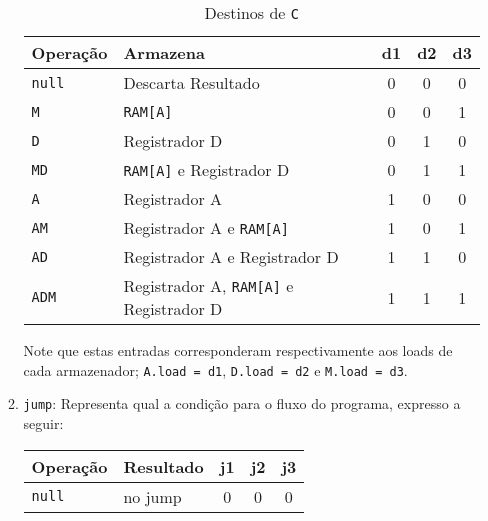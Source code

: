 \documentclass{article}
\begin{document}
\begin{enumerate}[noitemsep]
\begin{enumerate}
\begin{table}[H]
                                    \centering
                                    \begin{tabular}[]{l|l|ccc}\hline
                                        Operação      & Armazena                                       & d1& d2& d3\\\hline
                                        \texttt{null} & Descarta Resultado                             & 0 & 0 & 0\\
                                        \texttt{M}    & \texttt{RAM[A]}                                & 0 & 0 & 1\\
                                        \texttt{D}    & Registrador D                                  & 0 & 1 & 0\\
                                        \texttt{MD}   & \texttt{RAM[A]} e Registrador D                & 0 & 1 & 1\\
                                        \texttt{A}    & Registrador A                                  & 1 & 0 & 0\\
                                        \texttt{AM}   & Registrador A e \texttt{RAM[A]}                & 1 & 0 & 1\\
                                        \texttt{AD}   & Registrador A e Registrador D                  & 1 & 1 & 0\\
                                        \texttt{ADM}  & Registrador A, \texttt{RAM[A]} e Registrador D & 1 & 1 & 1\\\hline
                                    \end{tabular}
                                    \caption{Destinos de \texttt{C}}
                                \end{table}\noindent
                            Note que estas entradas corresponderam respectivamente aos loads de cada armazenador; \texttt{A.load = d1}, \texttt{D.load = d2} e \texttt{M.load = d3}.
                            \item \texttt{jump}: Representa qual a condição para o fluxo do programa, expresso a seguir:
                                \begin{table}[H]
                                    \centering
                                    \begin{tabular}[]{l|l|ccc}\hline
                                        Operação      & Resultado          & j1& j2& j3\\\hline
                                        \texttt{null} & no jump            & 0 & 0 & 0\\

\end{tabular}
\end{table}
\end{enumerate}
\end{enumerate}
\end{document}
